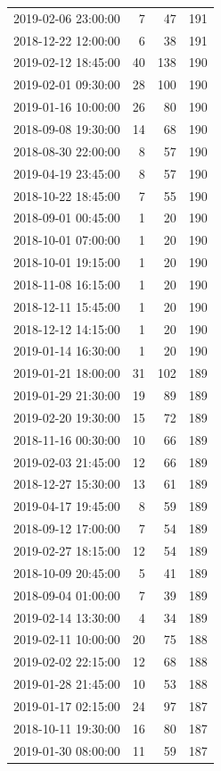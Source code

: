 \begin{tabular}{lrrr}
2019-02-06 23:00:00 & 7 & 47 & 191 \\
2018-12-22 12:00:00 & 6 & 38 & 191 \\
2019-02-12 18:45:00 & 40 & 138 & 190 \\
2019-02-01 09:30:00 & 28 & 100 & 190 \\
2019-01-16 10:00:00 & 26 & 80 & 190 \\
2018-09-08 19:30:00 & 14 & 68 & 190 \\
2018-08-30 22:00:00 & 8 & 57 & 190 \\
2019-04-19 23:45:00 & 8 & 57 & 190 \\
2018-10-22 18:45:00 & 7 & 55 & 190 \\
2018-09-01 00:45:00 & 1 & 20 & 190 \\
2018-10-01 07:00:00 & 1 & 20 & 190 \\
2018-10-01 19:15:00 & 1 & 20 & 190 \\
2018-11-08 16:15:00 & 1 & 20 & 190 \\
2018-12-11 15:45:00 & 1 & 20 & 190 \\
2018-12-12 14:15:00 & 1 & 20 & 190 \\
2019-01-14 16:30:00 & 1 & 20 & 190 \\
2019-01-21 18:00:00 & 31 & 102 & 189 \\
2019-01-29 21:30:00 & 19 & 89 & 189 \\
2019-02-20 19:30:00 & 15 & 72 & 189 \\
2018-11-16 00:30:00 & 10 & 66 & 189 \\
2019-02-03 21:45:00 & 12 & 66 & 189 \\
2018-12-27 15:30:00 & 13 & 61 & 189 \\
2019-04-17 19:45:00 & 8 & 59 & 189 \\
2018-09-12 17:00:00 & 7 & 54 & 189 \\
2019-02-27 18:15:00 & 12 & 54 & 189 \\
2018-10-09 20:45:00 & 5 & 41 & 189 \\
2018-09-04 01:00:00 & 7 & 39 & 189 \\
2019-02-14 13:30:00 & 4 & 34 & 189 \\
2019-02-11 10:00:00 & 20 & 75 & 188 \\
2019-02-02 22:15:00 & 12 & 68 & 188 \\
2019-01-28 21:45:00 & 10 & 53 & 188 \\
2019-01-17 02:15:00 & 24 & 97 & 187 \\
2018-10-11 19:30:00 & 16 & 80 & 187 \\
2019-01-30 08:00:00 & 11 & 59 & 187 \\

\end{tabular}
